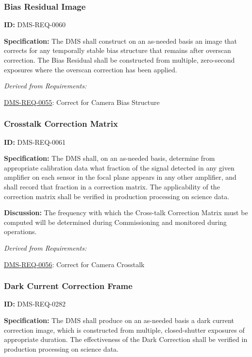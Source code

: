 \documentclass[SE,toc,lsstdraft]{lsstdoc}
\begin{document}
\subsubsection{Bias Residual Image}

\label{DMS-REQ-0060}
\textbf{ID:} DMS-REQ-0060

\textbf{Specification:} The DMS shall construct on an as-needed basis an image that corrects for any temporally stable bias structure that remains after overscan correction. The Bias Residual shall be constructed from multiple, zero-second exposures where the overscan correction has been applied.






\emph{Derived from Requirements:}

\hyperref[DMS-REQ-0055]{DMS-REQ-0055}:
Correct for Camera Bias Structure \newline


\subsubsection{Crosstalk Correction Matrix}

\label{DMS-REQ-0061}
\textbf{ID:} DMS-REQ-0061

\textbf{Specification:} The DMS shall, on an as-needed basis, determine from appropriate calibration data what fraction of the signal detected in any given amplifier on each sensor in the focal plane appears in any other amplifier, and shall record that fraction in a correction matrix. The applicability of the correction matrix shall be verified in production processing on science data.

\textbf{Discussion: }The frequency with which the Cross-talk Correction Matrix must be computed will be determined during Commissioning and monitored during operations.




\emph{Derived from Requirements:}

\hyperref[DMS-REQ-0056]{DMS-REQ-0056}:
Correct for Camera Crosstalk \newline


\subsubsection{Dark Current Correction Frame}

\label{DMS-REQ-0282}
\textbf{ID:} DMS-REQ-0282

\textbf{Specification:} The DMS shall produce on an as-needed basis a dark current correction image, which is constructed from multiple, closed-shutter exposures of appropriate duration. The effectiveness of the Dark Correction shall be verified in production processing on science data.
\end{document}

